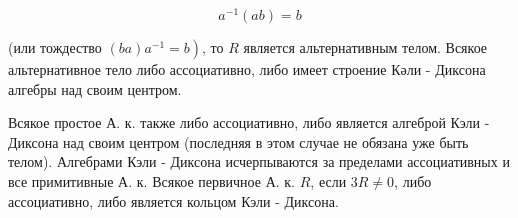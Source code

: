 \documentclass[10pt]{article}
\begin{document}
\[

a^{-1}(a b)=b

\]



(или тождество $\left.(b a) a^{-1}=b\right)$, то $R$ является альтернативным телом. Всякое альтернативное тело либо ассоциативно, либо имеет строение Кәли - Диксона алгебры над своим центром.



Всякое простое А. к. также либо ассоциативно, либо является алгеброй Кэли - Диксона над своим центром (последняя в этом случае не обязана уже быть телом). Алгебрами Кэли - Диксона исчерпываются за пределами ассоциативных и все примитивные А. к. Всякое первичное А. к. $R$, если $3 R \neq 0$, либо ассоциативно, либо является кольцом Кэли - Диксона.
\end{document}
